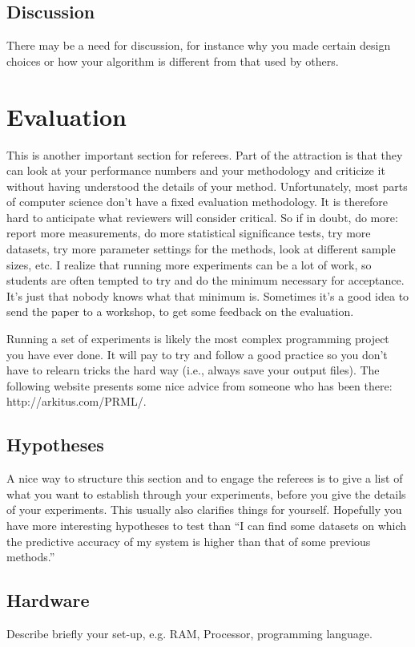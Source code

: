 \documentclass{article}
\begin{document}
\subsection{Discussion} There may be a need for discussion, for instance why you made certain design choices or how your algorithm is different from that used by others.

\section{Evaluation} This is another important section for referees. Part of the attraction is that they can look at your performance numbers and your methodology and criticize it without having understood the details of your method. Unfortunately, most parts of computer science don't have a fixed evaluation methodology. It is therefore hard to anticipate what reviewers will consider critical. So if in doubt, do more: report more measurements, do more statistical significance tests, try more datasets, try more parameter settings for the methods, look at different sample sizes, etc. I realize that running more experiments can be a lot of work, so students are often tempted to try and do the minimum necessary for acceptance. It's just that nobody knows what that minimum is. Sometimes it's a good idea to send the paper to a workshop, to get some feedback on the evaluation.

Running a set of experiments is likely the most complex programming project you have ever done. It will pay to try and follow a good practice so you don't have to relearn tricks the hard way (i.e., always save your output files). The following website presents some nice advice from someone who has been there: http://arkitus.com/PRML/.

\subsection{Hypotheses} A nice way to structure this section and to engage the referees is to give a list of what you want to establish through your experiments, before you give the details of your experiments. This usually also clarifies things for yourself. Hopefully you have more interesting hypotheses to test than ``I can find some datasets on which the predictive accuracy of my system is higher than that of some previous methods.''

\subsection{Hardware} Describe briefly your set-up, e.g. RAM, Processor, programming language.
\end{document}
